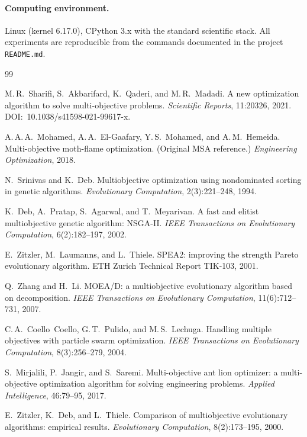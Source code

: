 \documentclass[11pt,a4paper]{article}
\begin{document}
\paragraph{Computing environment.}
Linux (kernel 6.17.0), CPython 3.x with the standard scientific stack.
All experiments are reproducible from the commands documented in the
project \texttt{README.md}.

\clearpage
\renewcommand{\refname}{References}
\begin{thebibliography}{99}

M.\,R.~Sharifi, S.~Akbarifard, K.~Qaderi, and M.\,R.~Madadi.
A new optimization algorithm to solve multi-objective problems.
\textit{Scientific Reports}, 11:20326, 2021.
DOI:~10.1038/s41598-021-99617-x.

A.\,A.\,A.~Mohamed, A.\,A.~El-Gaafary, Y.\,S.~Mohamed, and A.\,M.~Hemeida.
Multi-objective moth-flame optimization. (Original MSA reference.)
\textit{Engineering Optimization}, 2018.

N.~Srinivas and K.~Deb.
Multiobjective optimization using nondominated sorting in genetic algorithms.
\textit{Evolutionary Computation}, 2(3):221--248, 1994.

K.~Deb, A.~Pratap, S.~Agarwal, and T.~Meyarivan.
A fast and elitist multiobjective genetic algorithm: NSGA-II.
\textit{IEEE Transactions on Evolutionary Computation}, 6(2):182--197, 2002.

E.~Zitzler, M.~Laumanns, and L.~Thiele.
SPEA2: improving the strength Pareto evolutionary algorithm.
ETH Zurich Technical Report TIK-103, 2001.

Q.~Zhang and H.~Li.
MOEA/D: a multiobjective evolutionary algorithm based on decomposition.
\textit{IEEE Transactions on Evolutionary Computation}, 11(6):712--731, 2007.

C.\,A.~Coello~Coello, G.\,T.~Pulido, and M.\,S.~Lechuga.
Handling multiple objectives with particle swarm optimization.
\textit{IEEE Transactions on Evolutionary Computation}, 8(3):256--279, 2004.

S.~Mirjalili, P.~Jangir, and S.~Saremi.
Multi-objective ant lion optimizer: a multi-objective optimization algorithm
for solving engineering problems.
\textit{Applied Intelligence}, 46:79--95, 2017.

E.~Zitzler, K.~Deb, and L.~Thiele.
Comparison of multiobjective evolutionary algorithms: empirical results.
\textit{Evolutionary Computation}, 8(2):173--195, 2000.


\end{thebibliography}
\end{document}
